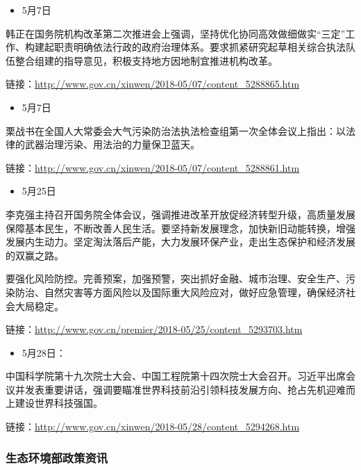\documentclass[]{book}
\providecommand{\tightlist}{%
  \setlength{\itemsep}{0pt}\setlength{\parskip}{0pt}}
\begin{document}
\begin{itemize}
\tightlist
\item
  5月7日
\end{itemize}

韩正在国务院机构改革第二次推进会上强调，坚持优化协同高效做细做实``三定''工作、构建起职责明确依法行政的政府治理体系。要求抓紧研究起草相关综合执法队伍整合组建的指导意见，积极支持地方因地制宜推进机构改革。

链接：\url{http://www.gov.cn/xinwen/2018-05/07/content_5288865.htm}

\begin{itemize}
\tightlist
\item
  5月7日
\end{itemize}

栗战书在全国人大常委会大气污染防治法执法检查组第一次全体会议上指出：以法律的武器治理污染、用法治的力量保卫蓝天。

链接：\url{http://www.gov.cn/xinwen/2018-05/07/content_5288861.htm}

\begin{itemize}
\tightlist
\item
  5月25日
\end{itemize}

李克强主持召开国务院全体会议，强调推进改革开放促经济转型升级，高质量发展保障基本民生，不断改善人民生活。要坚持新发展理念，加快新旧动能转换，增强发展内生动力。坚定淘汰落后产能，大力发展环保产业，走出生态保护和经济发展的双赢之路。

要强化风险防控。完善预案，加强预警，突出抓好金融、城市治理、安全生产、污染防治、自然灾害等方面风险以及国际重大风险应对，做好应急管理，确保经济社会大局稳定。

链接：\url{http://www.gov.cn/premier/2018-05/25/content_5293703.htm}

\begin{itemize}
\tightlist
\item
  5月28日：
\end{itemize}

中国科学院第十九次院士大会、中国工程院第十四次院士大会召开。习近平出席会议并发表重要讲话，强调要瞄准世界科技前沿引领科技发展方向、抢占先机迎难而上建设世界科技强国。

链接：\url{http://www.gov.cn/xinwen/2018-05/28/content_5294268.htm}

\hypertarget{ux751fux6001ux73afux5883ux90e8ux653fux7b56ux8d44ux8baf-1}{%
\subsubsection*{生态环境部政策资讯}\label{ux751fux6001ux73afux5883ux90e8ux653fux7b56ux8d44ux8baf-1}}
\end{document}

